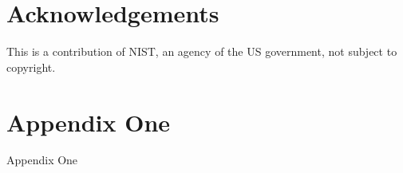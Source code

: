 \documentclass[twocolumn]{article}
\begin{document}
\section{Acknowledgements}

\vspace{1em}
\noindent This is a contribution of NIST, an agency of the US government, not subject to copyright.

\appendix

\section{\label{apx:one}Appendix One}
Appendix One

	

\end{document}
